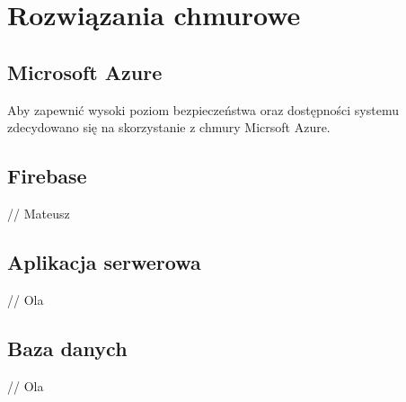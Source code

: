 \chapter{Rozwiązania chmurowe}

\section*{Microsoft Azure}

Aby zapewnić wysoki poziom bezpieczeństwa oraz dostępności systemu zdecydowano się na skorzystanie z chmury Micrsoft Azure.

\section*{Firebase}

// Mateusz

\section*{Aplikacja serwerowa}

// Ola

\section*{Baza danych}

// Ola